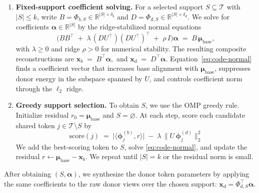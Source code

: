 \begin{enumerate}[leftmargin=*,topsep=0pt,itemsep=0pt,parsep=0pt,partopsep=0pt]
    \item \textbf{Fixed-support coefficient solving.}
For a selected support $S\subseteq\mathcal{T}$ with $|S|\le k$, write $B=\Phi_{b,S}\in\mathbb{R}^{|S|\times \delta_b}$ and $D=\Phi_{d,S}\in\mathbb{R}^{|S|\times \delta_d}$. We solve for coefficients $\boldsymbol{\alpha}\in\mathbb{R}^{|S|}$ by the ridge-stabilized normal equations
\begin{equation}
\label{eq:code-normal}
\Big(BB^\top \;+\; \lambda\,(DU^\top)(DU^\top)^\top \;+\; \rho\,I\Big)\boldsymbol{\alpha}
\;=\;
B\,\boldsymbol{\mu}_{\text{base}},
\end{equation}
with $\lambda\ge 0$ and ridge $\rho>0$ for numerical stability.
The resulting composite reconstructions are
$
\mathbf{x}_b \;=\; B^\top\boldsymbol{\alpha},$ and $ \mathbf{x}_d \;=\; D^\top\boldsymbol{\alpha}.
$
Equation~\eqref{eq:code-normal} finds a coefficient vector that increases base alignment with $\boldsymbol{\mu}_{\text{base}}$, suppresses donor energy in the subspace spanned by $U$, and controls coefficient norm through the $\ell_2$ ridge.

\item  \textbf{Greedy support selection.}
To obtain $S$, we use the OMP greedy rule. Initialize residual $r_0=\boldsymbol{\mu}_{\text{base}}$ and $S=\varnothing$. At each step, score each candidate shared token $j\in\mathcal{T}\setminus S$ by
\begin{equation}
\label{eq:code-score}
\mathrm{score}(j)
\;=\;
\big|\langle \boldsymbol{\phi}^{(b)}_j, r\rangle\big|
\;-\;
\lambda\,\|U\,\boldsymbol{\phi}^{(d)}_j\|_2^2
\end{equation}
We add the best-scoring token to $S$, solve \eqref{eq:code-normal}, and update the residual $r\leftarrow \boldsymbol{\mu}_{\text{base}}-\mathbf{x}_b$. We repeat until $|S|=k$ or the residual norm is small.
\end{enumerate}
After obtaining $(S,\boldsymbol{\alpha})$, we synthesize the donor token parameters by applying the same coefficients to the raw donor views over the chosen support: $\mathbf{x}_d=\Phi_{d,S}^\top\boldsymbol{\alpha}$.

\vspace{-2mm}
